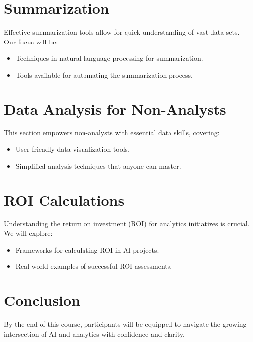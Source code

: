 \documentclass{article}
\begin{document}
\section{Summarization}
Effective summarization tools allow for quick understanding of vast data sets. Our focus will be:
\begin{itemize}
    \item Techniques in natural language processing for summarization.
    \item Tools available for automating the summarization process.
\end{itemize}

\section{Data Analysis for Non-Analysts}
This section empowers non-analysts with essential data skills, covering:
\begin{itemize}
    \item User-friendly data visualization tools.
    \item Simplified analysis techniques that anyone can master.
\end{itemize}

\section{ROI Calculations}
Understanding the return on investment (ROI) for analytics initiatives is crucial. We will explore:
\begin{itemize}
    \item Frameworks for calculating ROI in AI projects.
    \item Real-world examples of successful ROI assessments.
\end{itemize}

\section{Conclusion}
By the end of this course, participants will be equipped to navigate the growing intersection of AI and analytics with confidence and clarity.
\end{document}

